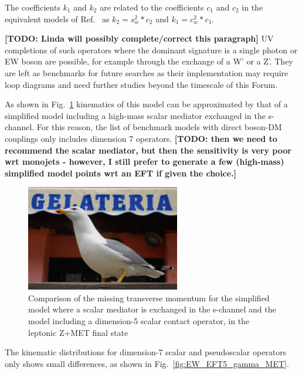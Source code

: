 The coefficients $k_1$ and $k_2$ are related to the coefficients $c_1$ and $c_2$ 
in the equivalent models of Ref.~\cite{Crivellin:2015wva} as $k_2 = s_w^2*c_2$ and $k_1=c_w^2 *c_1$.

\textbf{[TODO: Linda will possibly complete/correct this paragraph]} UV completions of 
such operators where the dominant signature is a single photon or EW boson are possible, 
for example through the exchange of a W' or a Z'. They are left as benchmarks for future searches as 
their implementation may require loop diagrams and need further studies beyond the timescale of this Forum. 

As shown in Fig.~\ref{fig:EW_EFT5_Zlep_MET}
kinematics of this model can be approximated by that of a simplified model including 
a high-mass scalar mediator exchanged in the s-channel. For this reason, 
the list of benchmark models with direct boson-DM couplings only includes dimension 7 operators. 
\textbf{[TODO: then we need to recommend the scalar mediator, 
but then the sensitivity is very poor wrt monojets - however, I still prefer
to generate a few (high-mass) simplified model points wrt an EFT if given the choice.]}

\begin{figure}
    \includegraphics[width=0.6\textwidth]{figures/gull}
    \caption{Comparison of the missing transverse momentum for the simplified model
    where a scalar mediator is exchanged in the s-channel and the model including 
    a dimension-5 scalar contact operator, in the leptonic Z+MET final state}
    \label{fig:EW_EFT5_Zlep_MET}
\end{figure}

The kinematic distributions for dimension-7 scalar and pseudoscalar operators 
only shows small differences, as shown in Fig.~\ref{fig:EW_EFT5_gamma_MET}. 

